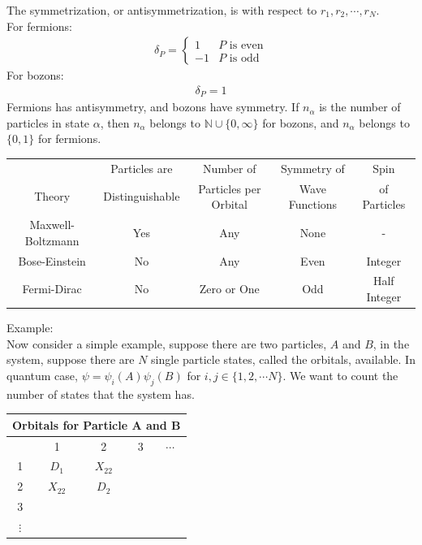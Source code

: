 \documentclass[11pt,oneside]{book}
\theoremstyle{break}
\theoremstyle{break}
\newcommand{\N}{\mathbb{N}}
\newcommand{\example}{\color{green}Example: \color{black}}
\begin{document}
The symmetrization, or antisymmetrization, is with respect to $r_1,r_2,\cdots, r_N$. \\
For fermions:
\begin{align*}
\delta_P = \begin{cases}
1 & P \text{ is even}\\
-1 & P \text{ is odd}
\end{cases}
\end{align*}
For bozons:
\begin{align*}
\delta_P = 1
\end{align*}
Fermions has antisymmetry, and bozons have symmetry. If $n_\alpha$ is the number of particles in state $\alpha$, then $n_\alpha$ belongs to $\N \cup \{0,\infty\}$ for bozons, and $n_\alpha$ belongs to $\{0,1\}$ for fermions.\\


\begin{center}
\begin{tabular}{|c|c|c|c|c|}
\hline
 & Particles are &  Number of & Symmetry of  &  Spin \\
Theory & Distinguishable & Particles per Orbital & Wave Functions& of Particles \\
\hline
Maxwell-Boltzmann & Yes & Any & None & - \\
\hline
Bose-Einstein & No & Any & Even & Integer\\
\hline
Fermi-Dirac & No & Zero or One & Odd & Half Integer\\
\hline
\end{tabular}
\end{center}

\example\\
Now consider a simple example, suppose there are two particles, $A$ and $B$, in the system, suppose there are $N$ single particle states, called the orbitals, available. In quantum case, $\psi = \psi_i (A) \psi_j (B)$ for $i,j \in \{1,2, \cdots N\}$. We want to count the number of states that the system has. \\


\begin{center}
\begin{tabular}{|c|c|c|c|c}
\hline
\multicolumn{5}{|c|}{Orbitals for Particle A and B}\\
\hline
 &1  &2 &3 & $\cdots$\\
\hline
1 & $D_1$ & $X_{22}$ & &\\
\hline
2 & $X_{22}$ & $D_2$ & &\\
\hline
3 &  &  & &\\
\hline
$\vdots$& & & & 
\end{tabular}
\end{center}
\end{document}
